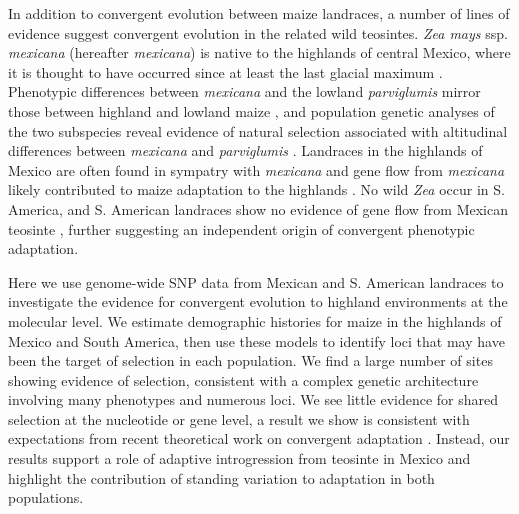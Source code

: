 In addition to convergent evolution between maize landraces, a number of lines of evidence suggest convergent evolution in the related wild teosintes.  
\emph{Zea mays} ssp. \emph{mexicana} (hereafter \emph{mexicana}) is native to the highlands of central Mexico, where it is thought to have occurred since at least the last glacial maximum \cite[]{Ross-Ibarra_2009_19153259, Hufford_niche}. 
Phenotypic differences between \emph{mexicana} and the lowland \emph{parviglumis} mirror those between highland and lowland maize \cite[]{Lauter_2004_15342532}, and population genetic analyses of the two subspecies reveal evidence of natural selection associated with altitudinal differences between \emph{mexicana} and \emph{parviglumis} \cite[]{Pyhajarvi2013,fang2012megabase}.  
Landraces in the highlands of Mexico are often found in sympatry with \emph{mexicana} and gene flow from \emph{mexicana} likely contributed to maize adaptation to the highlands \cite[]{Profford_2013}. 
No wild \emph{Zea} occur in S. America, and S. American landraces show no evidence of gene flow from Mexican teosinte \cite[]{vanHeerwaarden_2011_21189301}, further suggesting an independent origin of convergent phenotypic adaptation.

Here we use genome-wide SNP data from Mexican and S. American landraces to investigate the evidence for convergent evolution to highland environments at the molecular level.  
We estimate demographic histories for maize in the highlands of Mexico and South America, then use these models to identify loci that may have been the target of selection in each population.
We find a large number of sites showing evidence of selection, consistent with a complex genetic architecture involving many phenotypes and numerous loci.  
We see little evidence for shared selection at the nucleotide or gene level, a result we show is consistent with expectations from recent theoretical work on convergent adaptation \cite[]{ralph2014convergent}.
Instead, our results support a role of adaptive introgression from teosinte in Mexico and highlight the contribution of standing variation to adaptation in both populations.
